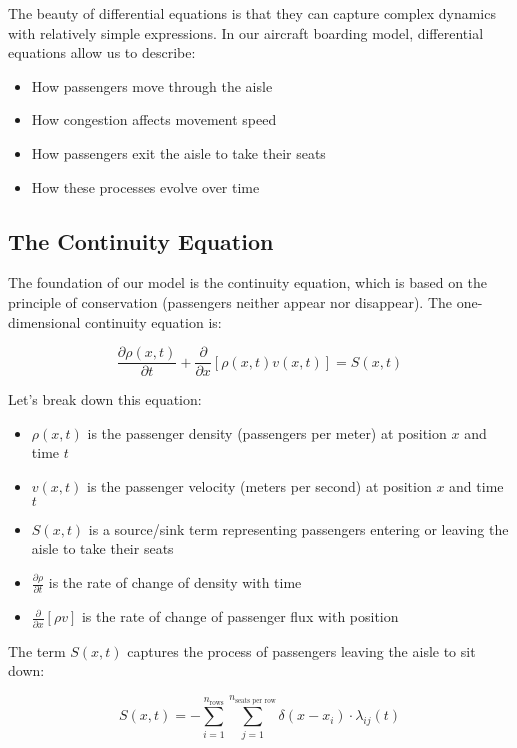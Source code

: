 \documentclass[a4paper,12pt]{article}
\begin{document}
The beauty of differential equations is that they can capture complex dynamics with relatively simple expressions. In our aircraft boarding model, differential equations allow us to describe:
\begin{itemize}
    \item How passengers move through the aisle
    \item How congestion affects movement speed
    \item How passengers exit the aisle to take their seats
    \item How these processes evolve over time
\end{itemize}

\subsection{The Continuity Equation}

The foundation of our model is the continuity equation, which is based on the principle of conservation (passengers neither appear nor disappear). The one-dimensional continuity equation is:

\begin{equation}
\frac{\partial \rho(x,t)}{\partial t} + \frac{\partial}{\partial x}[\rho(x,t)v(x,t)] = S(x,t)
\end{equation}

Let's break down this equation:
\begin{itemize}
    \item $\rho(x,t)$ is the passenger density (passengers per meter) at position $x$ and time $t$
    \item $v(x,t)$ is the passenger velocity (meters per second) at position $x$ and time $t$
    \item $S(x,t)$ is a source/sink term representing passengers entering or leaving the aisle to take their seats
    \item $\frac{\partial \rho}{\partial t}$ is the rate of change of density with time
    \item $\frac{\partial}{\partial x}[\rho v]$ is the rate of change of passenger flux with position
\end{itemize}

The term $S(x,t)$ captures the process of passengers leaving the aisle to sit down:

\begin{equation}
S(x,t) = -\sum_{i=1}^{n_{\text{rows}}} \sum_{j=1}^{n_{\text{seats per row}}} \delta(x - x_i) \cdot \lambda_{ij}(t)
\end{equation}
\end{document}
